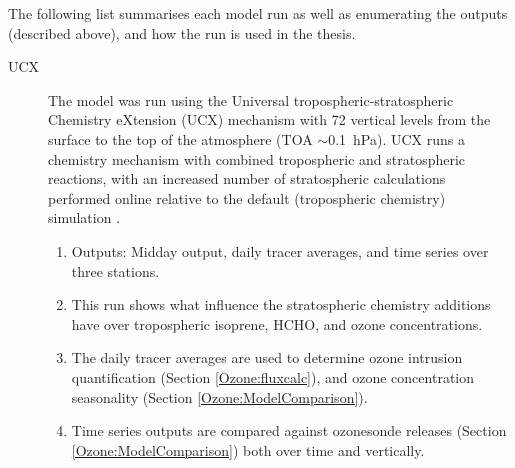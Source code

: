       The following list summarises each model run as well as enumerating the outputs (described above), and how the run is used in the thesis.
      \begin{description}
        \item[UCX]%
          The model was run using the Universal tropospheric-stratospheric Chemistry eXtension (UCX) mechanism with 72 vertical levels from the surface to the top of the atmosphere (TOA $\sim$0.1~hPa).
          UCX runs a chemistry mechanism with combined tropospheric and stratospheric reactions, with an increased number of stratospheric calculations performed online relative to the default (tropospheric chemistry) simulation \parencite{Eastham2014}.
          \begin{enumerate}
            \item Outputs: Midday output, daily tracer averages, and time series over three stations.
            \item This run shows what influence the stratospheric chemistry additions have over tropospheric isoprene, HCHO, and ozone concentrations.
            \item The daily tracer averages are used to determine ozone intrusion quantification (Section \ref{Ozone:fluxcalc}), and ozone concentration seasonality (Section \ref{Ozone:ModelComparison}).
            \item Time series outputs are compared against ozonesonde releases (Section \ref{Ozone:ModelComparison}) both over time and vertically.
          \end{enumerate}
        

\end{description}
